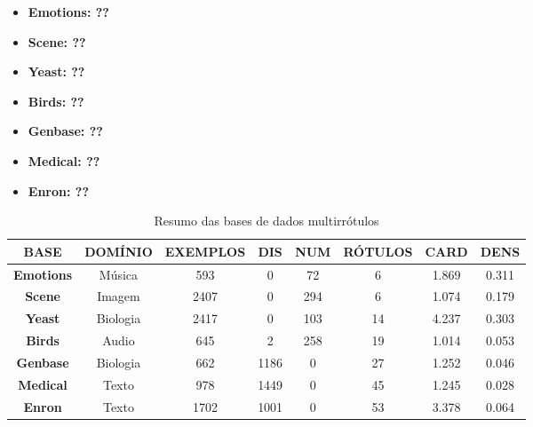 \begin{itemize}
\item \bf{Emotions}: ??
\item \bf{Scene}: ??
\item \bf{Yeast}: ??
\item \bf{Birds}: ??
\item \bf{Genbase}: ??
\item \bf{Medical}: ??
\item \bf{Enron}: ??	

\end{itemize}
\label{tab:datas}
\begin{table}[h]
\caption{Resumo das bases de dados multirrótulos}
\begin{tabular}{|c|ccccccc|}
\hline
\textbf{BASE}     & \textbf{DOMÍNIO} & \textbf{EXEMPLOS} & \textbf{DIS} & \textbf{NUM} & \textbf{RÓTULOS} & \textbf{CARD} & \textbf{DENS} \\ \hline
\textbf{Emotions} & Música           & 593               & 0                 & 72                 & 6                & 1.869                  & 0.311              \\
\textbf{Scene}    & Imagem           & 2407              & 0                 & 294                & 6                & 1.074                  & 0.179              \\
\textbf{Yeast}    & Biologia         & 2417              & 0                 & 103                & 14               & 4.237                  & 0.303              \\
\textbf{Birds}    & Audio            & 645               & 2                 & 258                & 19               & 1.014                  & 0.053              \\
\textbf{Genbase}  & Biologia         & 662               & 1186              & 0                  & 27               & 1.252                  & 0.046              \\
\textbf{Medical}  & Texto            & 978               & 1449              & 0                  & 45               & 1.245                  & 0.028              \\
\textbf{Enron}    & Texto            & 1702              & 1001              & 0                  & 53               & 3.378                  & 0.064             \\ \hline
\end{tabular}
\end{table}

